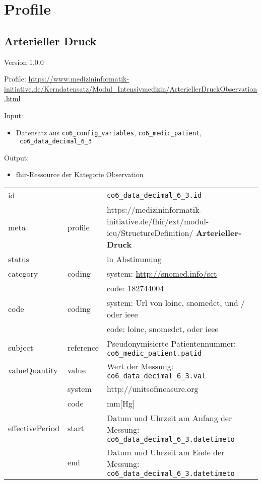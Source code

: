 \section{Profile} \label{sec:profil}

\subsection{Arterieller Druck} 
\noindent Version 1.0.0

\noindent Profile: \url{https://www.medizininformatik-initiative.de/Kerndatensatz/Modul_Intensivmedizin/ArteriellerDruckObservation.html}

\noindent Input:
\begin{itemize}
	\item Datensatz aus \texttt{co6\_config\_variables}, \texttt{co6\_medic\_patient}, \\ \texttt{
co6\_data\_decimal\_6\_3}
\end{itemize}
Output:
\begin{itemize}
        \item \ac{fhir}-Ressource der Kategorie \glqq Observation\grqq{}
\end{itemize}
\begin{longtable}{|l|l|p{7.5cm}|}
        \hline
        \rowcolor{lightgray} \multicolumn{3}{|l|}{Data Mapping (inhaltlich)} \\ \hline
        id &  & \texttt{co6\_data\_decimal\_6\_3.id} \\ \hline
	meta & profile & https://medizininformatik-initiative.de/fhir/ext/modul-icu/StructureDefinition/\textbf{
Arterieller-Druck} \\ \hline 
	status &  & in Abstimmung  \\ \hline 
	category & coding & system: \url{http://snomed.info/sct} \\
\cline{3-3}
	& & code: 182744004 \\ \hline
	code & coding & system: Url von \ac{loinc}, \ac{snomedct}, und / oder \ac{ieee} \\ 
	\cline{3-3} 
	 &  & code: \ac{loinc}, \ac{snomedct}, oder \ac{ieee} \\ \hline
	subject & reference & Pseudonymisierte Patientennummer: \texttt{co6\_medic\_patient.patid} \\ \hline
	valueQuantity & value & Wert der Messung: \texttt{
co6\_data\_decimal\_6\_3.val} \\
        \cline{2-3}
         & system & http://unitsofmeasure.org \\
         \cline{2-3}
         & code &
mm[Hg]
\\ \hline
    effectivePeriod & start & Datum und Uhrzeit am Anfang der Messung: \texttt{
co6\_data\_decimal\_6\_3.datetimeto} \\
    \cline{2-3}
     & end & Datum und Uhrzeit am Ende der Messung: \texttt{
co6\_data\_decimal\_6\_3.datetimeto} \\ \hline
\end{longtable}


